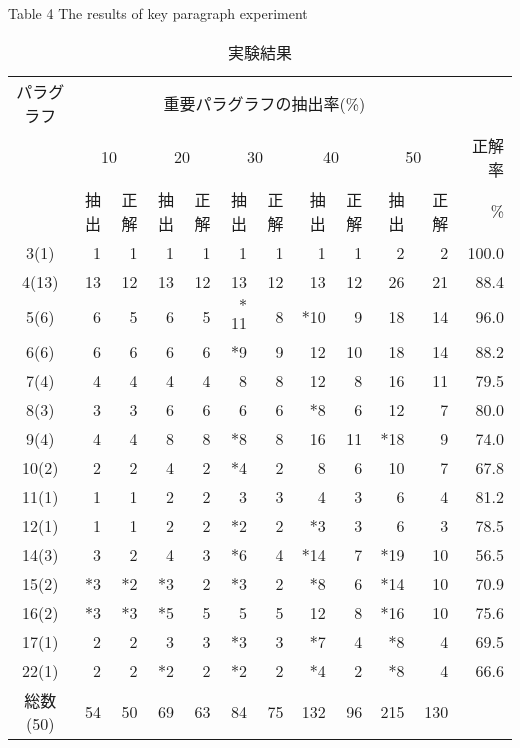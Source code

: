 {\footnotesize
\begin{table}[htbp]
\begin{center}
\caption{実験結果} \label{result}
\vspace*{-3mm}
Table 4 The results of key paragraph experiment \\
\begin{tabular}{|c|r|r|r|r|r|r|r|r|r|r|r|} \hline \hline
\multicolumn{1}{|c|}{パラグラフ} &\multicolumn{10}{c|}{重要パラグラフの抽出率(\%)} & \\ \cline{2-11}
\multicolumn{1}{|c|}{\raisebox{-1.5ex}{(記事)}} &\multicolumn{2}{c|}{10} &\multicolumn{2}{c|}{20} &\multicolumn{2}{c|}{30} &\multicolumn{2}{c|}{40} &\multicolumn{2}{c|}{50} &正解率 \\ \cline{2-11}
\multicolumn{1}{|c|}{} &抽出 &正解 &抽出 &正解 &抽出 &正解 &抽出 &正解 &抽出 &正 解&\% \\ \cline{1-12}
3(1) &1 &1 &1 &1 &1 &1 &1 &1 &2 &2 &100.0\\ \cline{2-12}
4(13) &13 &12 &13 &12 &13 &12 &13 &12 &26 &21 &88.4 \\ \cline{2-12}
5(6) &6 &5 &6 &5 &$\ast$11 &8 &$\ast$10 &9 &18 &14 &96.0 \\ \cline{2-12}
6(6) &6 &6 &6 &6 &$\ast$9 &9 &12 &10 &18 &14 &88.2 \\ \cline{2-12}
7(4) &4 &4 &4 &4 &8 &8 &12 &8 &16 &11 &79.5 \\ \cline{2-12}
8(3) &3 &3 &6 &6 &6 &6 &$\ast$8 &6 &12 &7 &80.0 \\ \cline{2-12}
9(4) &4 &4 &8 &8 &$\ast$8 &8 &16 &11 &$\ast$18 &9 &74.0 \\ \cline{2-12}
10(2) &2 &2 &4 &2 &$\ast$4 &2 &8 &6 &10 &7 &67.8 \\ \cline{2-12}
11(1) &1 &1 &2 &2 &3 &3 &4 &3 &6 &4 &81.2 \\ \cline{2-12}
12(1) &1 &1 &2 &2 &$\ast$2 &2 &$\ast$3 &3 &6 &3 &78.5 \\ \cline{2-12}
14(3) &3 &2 &4 &3 &$\ast$6 &4 &$\ast$14 &7 &$\ast$19 &10 &56.5 \\ \cline{2-12}
15(2) &$\ast$3 &$\ast$2 &$\ast$3 &2 &$\ast$3 &2 &$\ast$8 &6 &$\ast$14 &10 &70.9 \\ \cline{2-12}
16(2) &$\ast$3 &$\ast$3 &$\ast$5 &5 &5 &5 &12 &8 &$\ast$16 &10 & 75.6 \\ \cline{2-12}
17(1) &2 &2 &3 &3 &$\ast$3 &3 &$\ast$7 &4 &$\ast$8 &4 &69.5  \\ \cline{2-12}
22(1) &2 &2 &$\ast$2 &2 &$\ast$2 &2 &$\ast$4 &2 &$\ast$8 &4 &66.6 \\ \hline
\multicolumn{1}{|c|}{総数(50)}  &54 &50 &69 &63 &84 &75 &132 &96 &215 &130  \\ \cline{1-11}

\end{tabular}
\end{center}
\end{table}}
